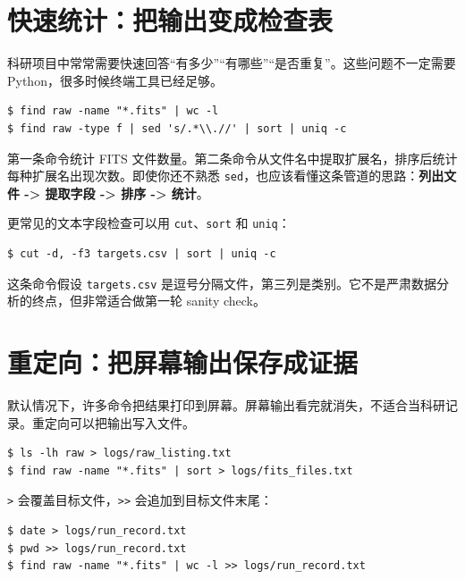 \section{快速统计：把输出变成检查表}

科研项目中常常需要快速回答“有多少”“有哪些”“是否重复”。这些问题不一定需要 Python，很多时候终端工具已经足够。

\begin{examplebox}[文件数量和后缀统计]
\begin{lstlisting}[style=terminal]
$ find raw -name "*.fits" | wc -l
$ find raw -type f | sed 's/.*\\.//' | sort | uniq -c
\end{lstlisting}
\end{examplebox}

第一条命令统计 FITS 文件数量。第二条命令从文件名中提取扩展名，排序后统计每种扩展名出现次数。即使你还不熟悉 \texttt{sed}，也应该看懂这条管道的思路：\textbf{列出文件 -> 提取字段 -> 排序 -> 统计}。

更常见的文本字段检查可以用 \texttt{cut}、\texttt{sort} 和 \texttt{uniq}：

\begin{examplebox}
\begin{lstlisting}[style=terminal]
$ cut -d, -f3 targets.csv | sort | uniq -c
\end{lstlisting}
\end{examplebox}

这条命令假设 \texttt{targets.csv} 是逗号分隔文件，第三列是类别。它不是严肃数据分析的终点，但非常适合做第一轮 sanity check。

\section{重定向：把屏幕输出保存成证据}

默认情况下，许多命令把结果打印到屏幕。屏幕输出看完就消失，不适合当科研记录。重定向可以把输出写入文件。

\begin{examplebox}[保存目录快照]
\begin{lstlisting}[style=terminal]
$ ls -lh raw > logs/raw_listing.txt
$ find raw -name "*.fits" | sort > logs/fits_files.txt
\end{lstlisting}
\end{examplebox}

\texttt{>} 会覆盖目标文件，\texttt{>>} 会追加到目标文件末尾：

\begin{examplebox}[覆盖与追加]
\begin{lstlisting}[style=terminal]
$ date > logs/run_record.txt
$ pwd >> logs/run_record.txt
$ find raw -name "*.fits" | wc -l >> logs/run_record.txt
\end{lstlisting}
\end{examplebox}

